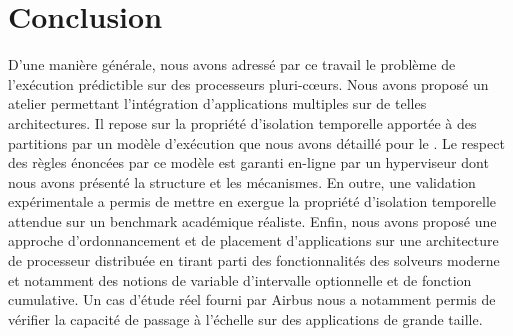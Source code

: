 \documentclass[main.tex]{subfiles}
\begin{document}
\section{Conclusion}
\label{sec_resumeFr_conclu}
D'une manière générale, nous avons adressé par ce travail le problème de l'exécution prédictible sur des processeurs pluri-c\oe{}urs. Nous avons proposé un atelier permettant l'intégration d'applications multiples sur de telles architectures. Il repose sur la propriété d'isolation temporelle apportée à des partitions par un modèle d'exécution que nous avons détaillé pour le \mppalong. Le respect des règles énoncées par ce modèle est garanti en-ligne par un hyperviseur dont nous avons présenté la structure et les mécanismes. En outre, une validation expérimentale a permis de mettre en exergue la propriété d'isolation temporelle attendue sur un benchmark académique réaliste. Enfin, nous avons proposé une approche d'ordonnancement et de placement d'applications sur une architecture de processeur distribuée en tirant parti des fonctionnalités des solveurs moderne et notamment des notions de variable d'intervalle optionnelle et de fonction cumulative. Un cas d'étude réel fourni par Airbus nous a notamment permis de vérifier la capacité de passage à l'échelle sur des applications de grande taille. 
\end{document}
